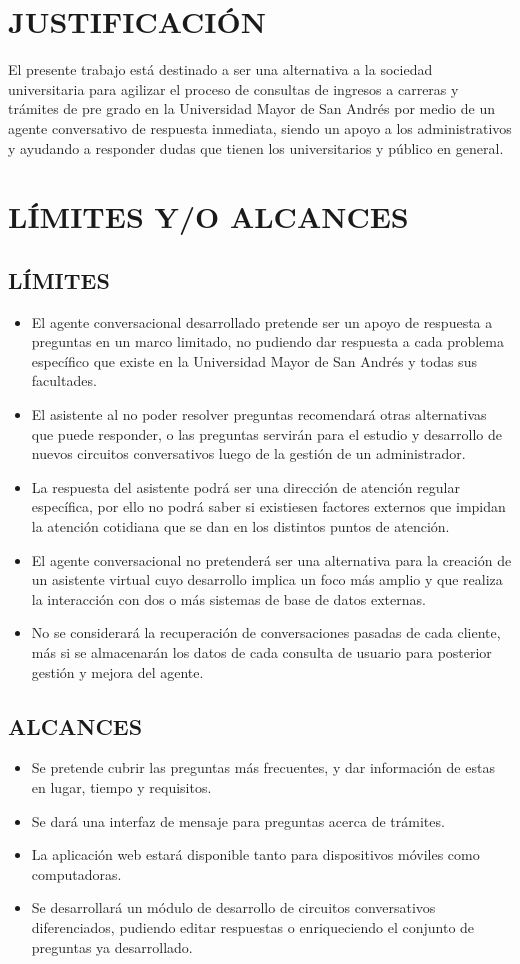 \documentclass[letter, openright, 12pt]{book}
\begin{document}
\section{JUSTIFICACIÓN}
El presente trabajo está destinado a ser una alternativa a la sociedad universitaria para agilizar el proceso de consultas de ingresos a carreras y trámites de pre grado en la Universidad Mayor de San Andrés por medio de un agente conversativo de respuesta inmediata, siendo un apoyo a los administrativos y ayudando a responder dudas que tienen los universitarios y público en general. 

\section{LÍMITES Y/O ALCANCES}
\subsection{LÍMITES}
\begin{itemize}
\item El agente conversacional desarrollado pretende ser un apoyo de respuesta a preguntas en un marco limitado, no pudiendo dar respuesta a cada problema específico que existe en la Universidad Mayor de San Andrés y todas sus facultades.
\item El asistente al no poder resolver preguntas recomendará otras alternativas que puede responder, o las preguntas servirán para el estudio y desarrollo de nuevos circuitos conversativos luego de la gestión de un administrador.
\item La respuesta del asistente podrá ser una dirección de atención regular específica, por ello no podrá saber si existiesen factores externos que impidan la atención cotidiana que se dan en los distintos puntos de atención.
\item El agente conversacional no pretenderá ser una alternativa para la creación de un asistente virtual cuyo desarrollo implica un foco más amplio y que realiza la interacción con dos o más sistemas de base de datos externas. 
\item No se considerará la recuperación de conversaciones pasadas de cada cliente, más si se almacenarán los datos de cada consulta de usuario para posterior gestión y mejora del agente. 
\end{itemize}

\subsection{ALCANCES}
\begin{itemize}
\item Se pretende cubrir las preguntas más frecuentes, y dar información de estas en lugar, tiempo y requisitos. 
\item Se dará una interfaz de mensaje para preguntas acerca de trámites. 
\item La aplicación web estará disponible tanto para dispositivos móviles como computadoras.
\item Se desarrollará un módulo de desarrollo de circuitos conversativos diferenciados, pudiendo editar respuestas o enriqueciendo el conjunto de preguntas ya desarrollado. 
\end{itemize}
\end{document}
